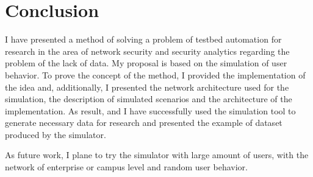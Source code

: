 
\section{Conclusion}

I have presented a method of solving a problem of testbed automation for research in the area of network security and security analytics regarding the problem of the lack of data. My proposal is based on the simulation of user behavior. To prove the concept of the method, I provided the implementation of the idea and, additionally, I presented the network  architecture used for the simulation, the description of simulated scenarios and the architecture of the implementation. As result, and I have successfully used the simulation tool to generate necessary data for research and presented the example of dataset produced by the simulator.

As future work, I plane to try the simulator with large amount of users, with the network of enterprise or campus level and random user behavior.